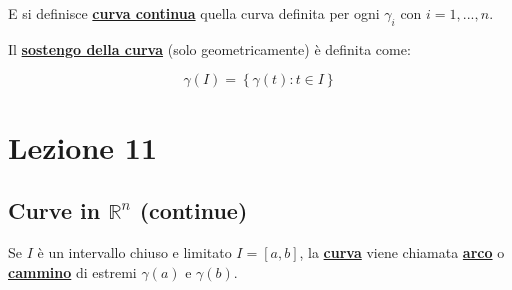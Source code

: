 \documentclass[a4paper]{article}
\begin{document}
	\noindent
	E si definisce \textcolor{Red3}{\textbf{\underline{curva continua}}} quella curva definita per ogni $\gamma_{i}$ con $i = 1, ..., n$.\newline
	
	\noindent
	Il \textcolor{Red3}{\textbf{\underline{sostengo della curva}}} (solo geometricamente) è definita come:
	
	\begin{equation*}
		\gamma\left(I\right) = \left\{\gamma\left(t\right) : t \in I\right\}
	\end{equation*}

	\newpage
	
	\section{Lezione 11}
	
	\subsection{Curve in $\mathbb{R}^{n}$ (continue)}
	
	Se $I$ è un intervallo chiuso e limitato $I = \left[a,b\right]$, la \textcolor{Red3}{\textbf{\underline{curva}}} viene chiamata \textcolor{Red3}{\textbf{\underline{arco}}} o \textcolor{Red3}{\textbf{\underline{cammino}}} di estremi $\gamma\left(a\right)$ e $\gamma\left(b\right)$.
	
\end{document}
